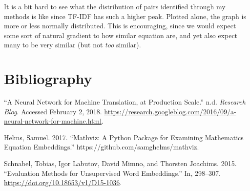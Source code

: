 \documentclass[]{article}
\begin{document}
It is a bit hard to see what the distribution of pairs identified
through my methods is like since TF-IDF has such a higher peak. Plotted
alone, the graph is more or less normally distributed. This is
encouraging, since we would expect some sort of natural gradient to how
similar equation are, and yet also expect many to be very similar (but
not \emph{too} similar).

\hypertarget{bibliography}{%
\section*{Bibliography}\label{bibliography}}

\hypertarget{refs}{}
\leavevmode\hypertarget{ref-noauthor_neural_nodate}{}%
``A Neural Network for Machine Translation, at Production Scale.'' n.d.
\emph{Research Blog}. Accessed February 2, 2018.
\url{https://research.googleblog.com/2016/09/a-neural-network-for-machine.html}.

\leavevmode\hypertarget{ref-samghelms_mathviz:_2017}{}%
Helms, Samuel. 2017. ``Mathviz: A Python Package for Examining
Mathematics Equation Embeddings.'' https://github.com/samghelms/mathviz.

\leavevmode\hypertarget{ref-schnabel_evaluation_2015}{}%
Schnabel, Tobias, Igor Labutov, David Mimno, and Thorsten Joachims.
2015. ``Evaluation Methods for Unsupervised Word Embeddings.'' In,
298--307. \url{https://doi.org/10.18653/v1/D15-1036}.
\end{document}
